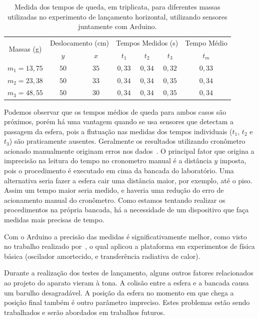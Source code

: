 \documentclass[11pt,a4paper]{article}
\begin{document}
\begin{table}[!hbt]
\centering
\begin{tabular}{ccccccc}
\toprule
\multirow{2}{*}{Massas (g)} & \multicolumn{2}{c}{Deslocamento (cm)} & \multicolumn{3}{c}{Tempos Medidos (s)} & Tempo Médio\\
\cmidrule(r){2-7}
& $y$ & $x$ & $t_1$ & $t_2$ & $t_3$ & $t_m$ \\
\midrule
$m_1 = 13,75$ & $50$ & $35$ & $0,33$ & $0,34$ & $0,32$ & $0,33$ \\
$m_2 = 23,38$ & $50$ & $33$ & $0,34$ & $0,34$ & $0,35$ & $0,34$ \\
$m_3 = 48,55$ & $50$ & $30$ & $0,34$ & $0,34$ & $0,35$ & $0,34$ \\
\bottomrule
\end{tabular}
\caption{Medida dos tempos de queda, em triplicata, para diferentes massas utilizadas no experimento de lançamento horizontal, utilizando sensores juntamente com Arduino.}
\label{tab:lancamento_arduino}
\end{table}



Podemos observar que os tempos médios de queda para ambos casos são próximos, porém há uma vantagem quando se usa sensores que detectam a passagem da esfera, pois a flutuação nas medidas dos tempos individuais ($t_1$, $t_2$ e $t_3$) são praticamente ausentes.
Geralmente os resultados utilizando cronômetro acionado manualmente originam erros nos dados~\cite{Andrades_2013}.
O principal fator que origina a imprecisão na leitura do tempo no cronometro manual é a distância $y$ imposta, pois o procedimento é executado em cima da bancada do laboratório.
Uma alternativa seria fazer a esfera cair uma distância maior, por exemplo, até o piso.
Assim um tempo maior seria medido, e haveria uma redução do erro de acionamento manual do cronômetro.
Como estamos tentando realizar os procedimentos na própria bancada, há a necessidade de um dispositivo que faça medidas mais precisas de tempo.


Com o Arduino a precisão das medidas é significativamente melhor, como visto no trabalho realizado por~\textcite{Souza_2011}, o qual aplicou a plataforma em experimentos de física básica (oscilador amortecido, e transferência radiativa de calor).


Durante a realização dos testes de lançamento, alguns outros fatores relacionados ao projeto do aparato vieram à tona.
A colisão entre a esfera e a bancada causa um barulho desagradável.
A posição da esfera no momento em que chega a posição final também é outro parâmetro impreciso. Estes problemas estão sendo trabalhados e serão abordados em trabalhos futuros.
\end{document}
